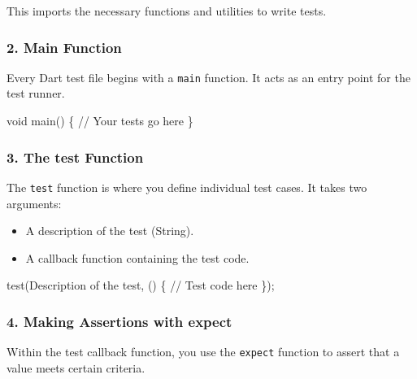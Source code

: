 \documentclass[
]{article}
\newenvironment{Shaded}{\begin{snugshade}}{\end{snugshade}}
\newcommand{\CommentTok}[1]{\textcolor[rgb]{0.48,0.49,0.49}{#1}}
\newcommand{\DataTypeTok}[1]{\textcolor[rgb]{0.16,0.50,0.73}{#1}}
\newcommand{\NormalTok}[1]{\textcolor[rgb]{0.81,0.81,0.76}{#1}}
\newcommand{\OperatorTok}[1]{\textcolor[rgb]{0.81,0.81,0.76}{#1}}
\newcommand{\StringTok}[1]{\textcolor[rgb]{0.96,0.31,0.31}{#1}}
\providecommand{\tightlist}{%
  \setlength{\itemsep}{0pt}\setlength{\parskip}{0pt}}
\begin{document}
This imports the necessary functions and utilities to write tests.

\subsubsection{2. Main Function}\label{main-function}

Every Dart test file begins with a \texttt{main} function. It acts as an
entry point for the test runner.

\begin{Shaded}
\begin{Highlighting}[]
\DataTypeTok{void}\NormalTok{ main() }\OperatorTok{\{}
  \CommentTok{// Your tests go here}
\OperatorTok{\}}
\end{Highlighting}
\end{Shaded}

\subsubsection{3. The test Function}\label{the-test-function}

The \texttt{test} function is where you define individual test cases. It
takes two arguments:

\begin{itemize}
\tightlist
\item
  A description of the test (String).
\item
  A callback function containing the test code.
\end{itemize}

\begin{Shaded}
\begin{Highlighting}[]
\NormalTok{test(}\StringTok{\textquotesingle{}Description of the test\textquotesingle{}}\OperatorTok{,}\NormalTok{ () }\OperatorTok{\{}
  \CommentTok{// Test code here}
\OperatorTok{\}}\NormalTok{);}
\end{Highlighting}
\end{Shaded}

\subsubsection{4. Making Assertions with
expect}\label{making-assertions-with-expect}

Within the test callback function, you use the \texttt{expect} function
to assert that a value meets certain criteria.
\end{document}

